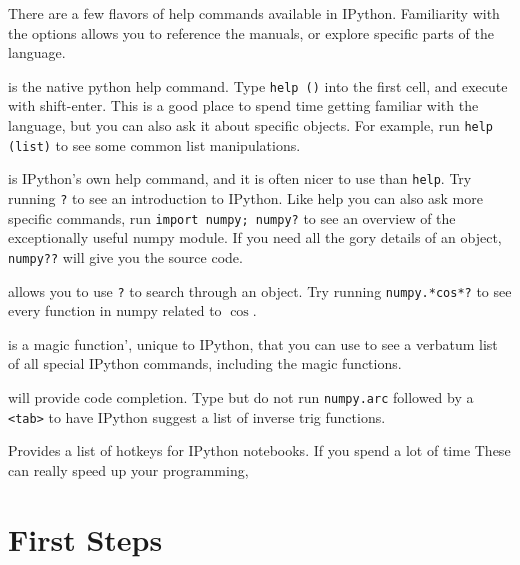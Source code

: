 \documentclass[justified, nobib]{tufte-handout}
\begin{document}
\smallskip
\noindent
There are a few flavors of help commands available in IPython. Familiarity with
the options allows you to reference the manuals, or explore specific parts of
the language.  
\\
\begin{description}[font=\tt, leftmargin=0cm]
\item[help ()] is the native python help command. Type \texttt{help ()} into
  the first cell, and execute with shift-enter. This is a good place to spend
  time getting familiar with the language, but you can also ask it about
  specific objects. For example, run \texttt{help (list)} to see some common
  list manipulations.
\item[?] is IPython's own help command, and it is often nicer to use than
  \texttt{help}. Try running \texttt{?} to see an introduction to IPython. Like
  help you can also ask more specific commands, run \texttt{import numpy;
    numpy?} to see an overview of the exceptionally useful numpy module. If you
  need all the gory details of an object, \texttt{numpy??} will give you the
  source code.
\item[<regex>?] allows you to use \texttt{?} to search through an object. Try
  running \texttt{numpy.*cos*?} to see every function in numpy related to
  $\cos$.
\item[\%quickref] is a magic function', unique to IPython, that you can use to
  see a verbatum list of all special IPython commands, including the magic
  functions.
\item[<tab>] will provide code completion. Type but do not run
  \texttt{numpy.arc} followed by a \texttt{<tab>} to have IPython suggest a
  list of inverse trig functions.
\item[Control-m h] Provides a list of hotkeys for IPython notebooks. If you
  spend a lot of time These can
  really speed up your programming,
\end{description}

\pagebreak

\section*{First Steps}
\end{document}

